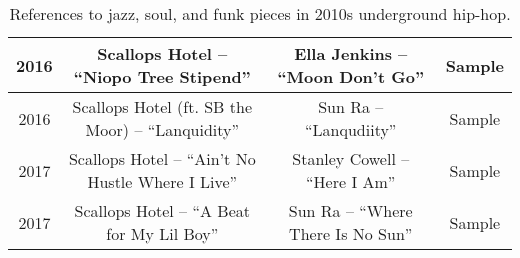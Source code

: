 \begin{sidewaystable}[p]
\begin{tabular}{|c|c|c|c|}
        2016 & Scallops Hotel -- ``Niopo Tree Stipend'' & Ella Jenkins -- ``Moon Don't Go'' & Sample \\ \hline
        2016 & Scallops Hotel (ft. SB the Moor) -- ``Lanquidity'' & Sun Ra -- ``Lanqudiity'' & Sample \\ \hline
        2017 & Scallops Hotel -- ``Ain't No Hustle Where I Live'' & Stanley Cowell -- ``Here I Am'' & Sample \\ \hline
        2017 & Scallops Hotel -- ``A Beat for My Lil Boy'' & Sun Ra -- ``Where There Is No Sun'' & Sample \\ \hline
    \end{tabular}
    \caption{References to jazz, soul, and funk pieces in 2010s underground hip-hop.}
    \label{tab:jazz_references}
\end{sidewaystable}


